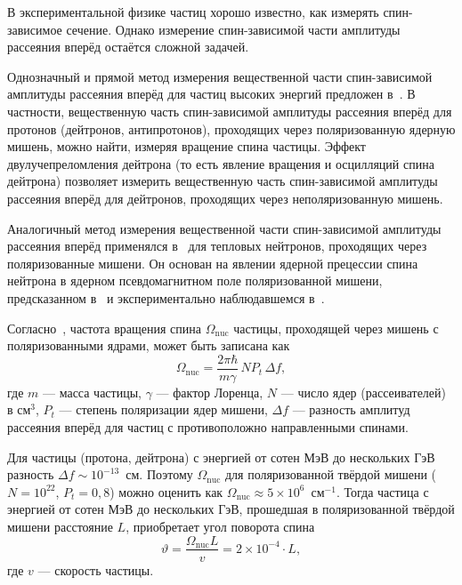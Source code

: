 \documentclass[11pt,a4paper]{article}
\begin{document}
В экспериментальной физике частиц хорошо известно, как измерять спин-зависимое
сечение. Однако измерение спин-зависимой части амплитуды рассеяния вперёд
остаётся сложной задачей.

Однозначный и прямой метод измерения вещественной части спин-зависимой
амплитуды рассеяния вперёд для частиц высоких энергий предложен
в~\cite{Bary83a,Bary83b,BaryDub89,BaryShekht96,Bary92,Bary93,Bary98,BarySTORI05}.
В частности, вещественную часть спин-зависимой амплитуды рассеяния вперёд
для протонов (дейтронов, антипротонов), проходящих через поляризованную
ядерную мишень, можно найти, измеряя вращение спина частицы. Эффект
двулучепреломления дейтрона (то есть явление вращения и осцилляций спина
дейтрона) позволяет измерить вещественную часть спин-зависимой амплитуды
рассеяния вперёд для дейтронов, проходящих через неполяризованную мишень.

Аналогичный метод измерения вещественной части спин-зависимой амплитуды
рассеяния вперёд применялся в~\cite{Abragam72,Forte73,Abragam82} для тепловых
нейтронов, проходящих через поляризованные мишени. Он основан на явлении
ядерной прецессии спина нейтрона в ядерном псевдомагнитном поле
поляризованной мишени, предсказанном в~\cite{BaryPod64} и экспериментально
наблюдавшемся в~\cite{Abragam72,Forte73,Abragam82}.

Согласно~\cite{BaryDub89,BaryShekht96}, частота вращения спина
$\Omega_{\mathrm{nuc}}$ частицы, проходящей через мишень с поляризованными
ядрами, может быть записана как
\begin{equation}
\Omega_{\mathrm{nuc}}=\frac{2\pi\hbar}{m\gamma}\,N P_t\,\Delta f,
\label{eq:1}
\end{equation}
где $m$ --- масса частицы, $\gamma$ --- фактор Лоренца, $N$ --- число ядер
(рассеивателей) в см$^3$, $P_t$ --- степень поляризации ядер мишени,
$\Delta f$ --- разность амплитуд рассеяния вперёд для частиц с противоположно
направленными спинами.

Для частицы (протона, дейтрона) с энергией от сотен МэВ до нескольких ГэВ
разность $\Delta f\sim 10^{-13}$~см. Поэтому $\Omega_{\mathrm{nuc}}$
для поляризованной твёрдой мишени ($N=10^{22}$, $P_t=0{,}8$) можно оценить
как $\Omega_{\mathrm{nuc}}\approx 5\times 10^{6}$~см$^{-1}$. Тогда частица
с энергией от сотен МэВ до нескольких ГэВ, прошедшая в поляризованной
твёрдой мишени расстояние $L$, приобретает угол поворота спина
\begin{equation}
\vartheta=\frac{\Omega_{\mathrm{nuc}}L}{v}=2\times 10^{-4}\cdot L,
\label{eq:2}
\end{equation}
где $v$ --- скорость частицы.
\end{document}
